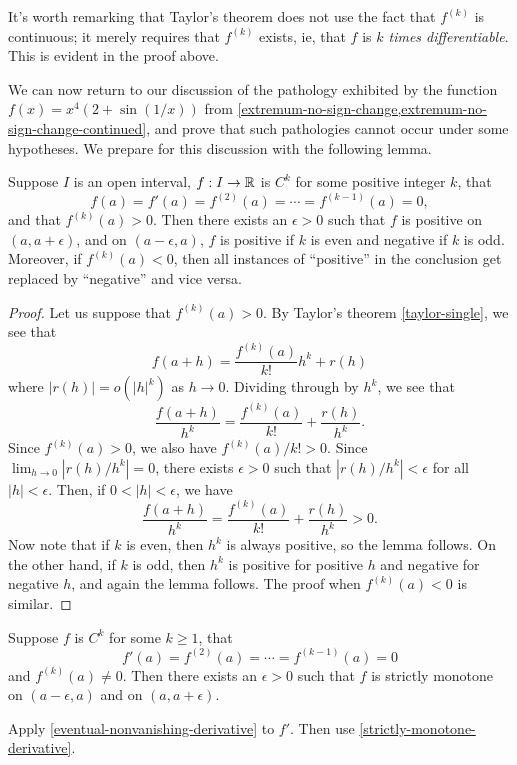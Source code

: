 \begin{remark}
	It's worth remarking that Taylor's theorem does not use the fact that $f^{(k)}$ is continuous; it merely requires that $f^{(k)}$ exists, ie, that $f$ is \emph{$k$ times differentiable}. This is evident in the proof above. 
\end{remark}

We can now return to our discussion of the pathology exhibited by the function $f(x) = x^4 \left( 2 + \sin(1/x) \right)$ from \cref{extremum-no-sign-change,extremum-no-sign-change-continued}, and prove that such pathologies cannot occur under some hypotheses. We prepare for this discussion with the following lemma. 

\begin{lemma} \label{eventual-nonvanishing-derivative}
	Suppose $I$ is an open interval, $f : I \to \mathbb{R}$ is $C^k$ for some positive integer $k$, that 
	\[ f(a) = f'(a) = f^{(2)}(a) = \dotsb = f^{(k-1)}(a) = 0, \] and that $f^{(k)}(a) > 0$. Then there exists an $\epsilon > 0$ such that $f$ is positive on $(a, a+\epsilon)$, and on $(a-\epsilon, a)$, $f$ is positive if $k$ is even and negative if $k$ is odd. Moreover, if $f^{(k)}(a) < 0$, then all instances of ``positive'' in the conclusion get replaced by ``negative'' and vice versa. 
\end{lemma}

\begin{proof}
	Let us suppose that $f^{(k)}(a) > 0$. By Taylor's theorem \ref{taylor-single}, we see that
	\[ f(a+h) = \frac{f^{(k)}(a)}{k!} h^k + r(h) \]
	where $|r(h)| = o(|h|^k)$ as $h \to 0$. Dividing through by $h^k$, we see that 
	\[ \frac{f(a+h)}{h^k} = \frac{f^{(k)}(a)}{k!} + \frac{r(h)}{h^k}. \]
	Since $f^{(k)}(a) > 0$, we also have $f^{(k)}(a)/k! > 0$. Since $\lim_{h \to 0} |r(h)/h^k| = 0$, there exists $\epsilon > 0$ such that $|r(h)/h^k| < \epsilon$ for all $|h| < \epsilon$. Then, if $0 < |h| < \epsilon$, we have
	\[ \frac{f(a+h)}{h^k} = \frac{f^{(k)}(a)}{k!} + \frac{r(h)}{h^k} > 0. \]
	Now note that if $k$ is even, then $h^k$ is always positive, so the lemma follows. On the other hand, if $k$ is odd, then $h^k$ is positive for positive $h$ and negative for negative $h$, and again the lemma follows. The proof when $f^{(k)}(a) < 0$ is similar. 
\end{proof}

\begin{exercise} \label{extremum-sign-change}
	Suppose $f$ is $C^k$ for some $k \geq 1$, that
	\[ f'(a) = f^{(2)}(a) = \dotsb = f^{(k-1)}(a) = 0 \] and $f^{(k)}(a) \neq 0$. Then there exists an $\epsilon > 0$ such that $f$ is strictly monotone on $(a-\epsilon, a)$ and on $(a, a+\epsilon)$. 
	\begin{hint}
		Apply \cref{eventual-nonvanishing-derivative} to $f'$. Then use \cref{strictly-monotone-derivative}. 
	\end{hint}
\end{exercise}

